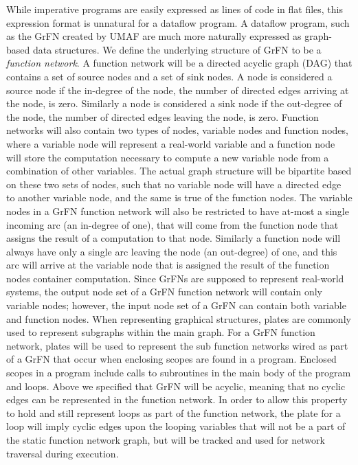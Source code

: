 While imperative programs are easily expressed as lines of code in flat files, this expression format is unnatural for a dataflow program.
A dataflow program, such as the GrFN created by UMAF are much more naturally expressed as graph-based data structures.
We define the underlying structure of GrFN to be a \emph{function network}.
A function network will be a directed acyclic graph (DAG) \citep{bondy1976graph} that contains a set of source nodes and a set of sink nodes.
A node is considered a source node if the in-degree of the node, the number of directed edges arriving at the node, is zero.
Similarly a node is considered a sink node if the out-degree of the node, the number of directed edges leaving the node, is zero.
Function networks will also contain two types of nodes, variable nodes and function nodes, where a variable node will represent a real-world variable and a function node will store the computation necessary to compute a new variable node from a combination of other variables.
The actual graph structure will be bipartite \citep{chartrand1977introGraphTheory} based on these two sets of nodes, such that no variable node will have a directed edge to another variable node, and the same is true of the function nodes.
The variable nodes in a GrFN function network will also be restricted to have at-most a single incoming arc (an in-degree of one), that will come from the function node that assigns the result of a computation to that node.
Similarly a function node will always have only a single arc leaving the node (an out-degree) of one, and this arc will arrive at the variable node that is assigned the result of the function nodes container computation.
Since GrFNs are supposed to represent real-world systems, the output node set of a GrFN function network will contain only variable nodes; however, the input node set of a GrFN can contain both variable and function nodes.
When representing graphical structures, plates are commonly used to represent subgraphs within the main graph. For a GrFN function network, plates will be used to represent the sub function networks wired as part of a GrFN that occur when enclosing scopes are found in a program.
Enclosed scopes in a program include calls to subroutines in the main body of the program and loops.
Above we specified that GrFN will be acyclic, meaning that no cyclic edges can be represented in the function network.
In order to allow this property to hold and still represent loops as part of the function network, the plate for a loop will imply cyclic edges upon the looping variables that will not be a part of the static function network graph, but will be tracked and used for network traversal during execution.

